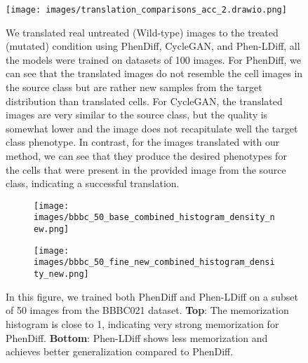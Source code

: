\begin{figure}

  \centering
  \texttt{[image: images/translation\_comparisons\_acc\_2.drawio.png]} %
  \caption{We translated real untreated (Wild-type) images to the treated (mutated) condition using PhenDiff, CycleGAN, and Phen-LDiff, all the models were trained on datasets of 100 images. For PhenDiff, we can see that the translated images do not resemble the cell images in the source class but are rather new samples from the target distribution than translated cells. For CycleGAN, the translated images are very similar to the source class, but the quality is somewhat lower and the image does not recapitulate well the target class phenotype. In contrast, for the images translated with our method, we can see that they produce the desired phenotypes for the cells that were present in the provided image from the source class, indicating a successful translation.}

  \label{fig:compare:methods}
\end{figure}




\begin{figure}[h]
  \centering
  \begin{subfigure}{\linewidth}
    \centering
    \texttt{[image: images/bbbc\_50\_base\_combined\_histogram\_density\_new.png]} %
    \caption{}
    \label{fig:subfigure1}
  \end{subfigure}

  \vspace{0.5cm} %

  \begin{subfigure}{\linewidth}
    \centering
    \texttt{[image: images/bbbc\_50\_fine\_new\_combined\_histogram\_density\_new.png]} %
    \caption{}
    \label{fig:subfigure2}
  \end{subfigure}

\caption{In this figure, we trained both PhenDiff and Phen-LDiff on a subset of 50 images from the BBBC021 dataset. \textbf{Top}: The memorization histogram is close to 1, indicating very strong memorization for PhenDiff. \textbf{Bottom}: Phen-LDiff shows less memorization and achieves better generalization compared to PhenDiff.}
  \label{fig:histo_compare}
\end{figure}







